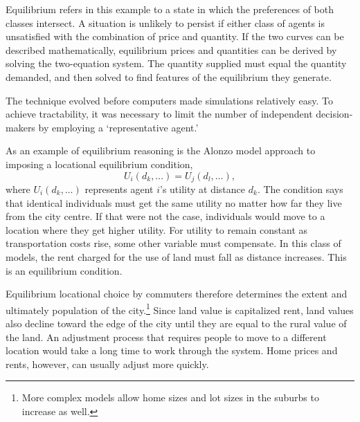 Equilibrium refers in this example to a state in which the preferences of both classes intersect. A situation is unlikely to persist if either class of agents is unsatisfied with the combination of price and quantity.  If the two curves can be described mathematically, equilibrium prices and quantities can be derived by solving the two-equation system. The quantity supplied must equal the quantity demanded, and then solved to find features of the equilibrium they generate. 

The technique evolved before computers made simulations relatively easy. To achieve tractability, it was necessary to limit the number of independent decision-makers by employing a `representative agent.' 


As an example of \gls{equilibrium reasoning} is the \Gls{Alonzo model} approach to imposing a locational equilibrium condition,
\[U_i(d_k,\dots)=U_j(d_l, \dots),\] where $U_i(d_k,\dots)$ represents agent $i$'s utility at distance $d_k$. 
The condition says that identical individuals must get the same utility no matter how far they live from the city centre. If that were not the case, individuals would move to a location where they get higher utility. For utility to remain constant as transportation costs rise, some other variable must compensate. In this class of models, the rent charged for the use of land must fall as distance increases.
This is an equilibrium condition. 

Equilibrium locational choice by commuters therefore determines the extent and ultimately population of the city.\footnote{More complex models allow home sizes and lot sizes in the suburbs to increase as well.} Since land value is \gls{capitalize}d rent, land values also decline toward the edge of the city until they are equal to the rural value of the land. 
An adjustment process that requires people to move to a different location would take a long time to work through the system. Home prices and rents, however, can usually adjust more quickly. 

